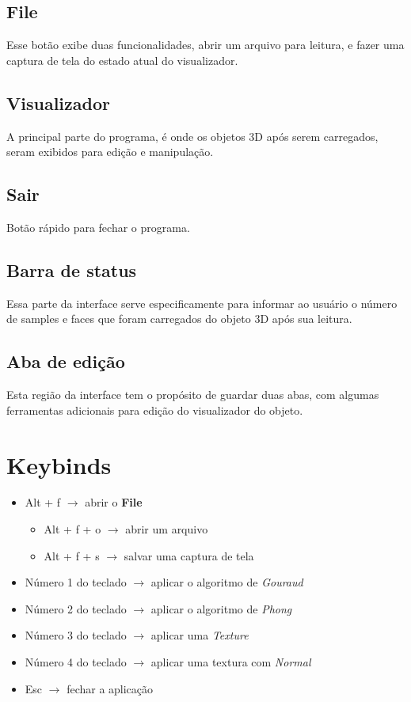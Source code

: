 \documentclass{ol-softwaremanual}
\begin{document}
\subsection{File}

Esse botão exibe duas funcionalidades, abrir um arquivo para 
leitura, e fazer uma captura de tela do estado atual do visualizador. 

\subsection{Visualizador}

A principal parte do programa, é onde os objetos 3D após 
serem carregados, seram exibidos para edição e manipulação.

\subsection{Sair}

Botão rápido para fechar o programa.

\subsection{Barra de status}

Essa parte da interface serve especificamente para 
informar ao usuário o número de samples e faces que foram 
carregados do objeto 3D após sua leitura.

\subsection{Aba de edição}

Esta região da interface tem o propósito de guardar 
duas abas, com algumas ferramentas adicionais para edição 
do visualizador do objeto. 

\section{Keybinds}

\begin{itemize}
    \item Alt + f $\rightarrow$ abrir o \textbf{File} 
    \begin{itemize}
        \item Alt + f + o $\rightarrow$ abrir um arquivo 
        \item Alt + f + s $\rightarrow$ salvar uma captura de tela 
    \end{itemize}
    \item Número 1 do teclado $\rightarrow$ aplicar o algoritmo de \emph{Gouraud}
    \item Número 2 do teclado $\rightarrow$ aplicar o algoritmo de \emph{Phong}
    \item Número 3 do teclado $\rightarrow$ aplicar uma \emph{Texture}
    \item Número 4 do teclado $\rightarrow$ aplicar uma textura com \emph{Normal}
    \item Esc $\rightarrow$ fechar a aplicação
\end{itemize}
\end{document}
